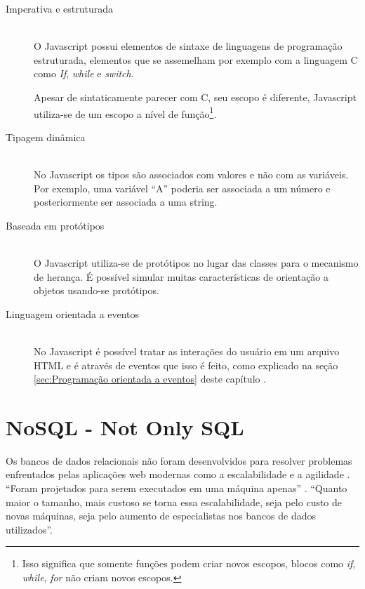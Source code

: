 \begin{description}
\item[Imperativa e estruturada] \hfill \\ 
O Javascript possui elementos de sintaxe de linguagens de programação estruturada, elementos que se assemelham por exemplo com a linguagem C como \textit{If}, \textit{while} e \textit{switch}.

Apesar de sintaticamente parecer com C, seu escopo é diferente, Javascript utiliza-se de um escopo a nível de função\footnote{Isso significa que somente funções podem criar novos escopos, blocos como \textit{if}, \textit{while}, \textit{for} não criam novos escopos.}.

\item[Tipagem dinâmica] \hfill \\
No Javascript os tipos são associados com valores e não com as variáveis. Por exemplo, uma variável ``A'' poderia ser associada a um número e posteriormente ser associada a uma string. 


\item[Baseada em protótipos] \hfill \\
 O Javascript utiliza-se de protótipos no lugar das classes para o mecanismo de herança. É possível simular muitas características de orientação a objetos usando-se protótipos.

\item[Linguagem orientada a eventos] \hfill \\
 No Javascript é possível tratar as interações do usuário em um arquivo HTML e é através de eventos que isso é feito, como explicado na seção \ref{sec:Programação orientada a eventos} deste capítulo .

\end{description}

\section{NoSQL - Not Only SQL}
\label{sec: NoSQL - Not Only SQL}
Os bancos de dados relacionais não foram desenvolvidos para resolver problemas enfrentados pelas aplicações web modernas como a escalabilidade e a agilidade \cite{mongoNosql}. ``Foram projetados para serem executados em uma máquina apenas'' \cite{compBds}. ``Quanto maior o tamanho, mais custoso se torna essa escalabilidade, seja pelo custo de novas máquinas, seja pelo aumento de especialistas nos bancos de dados utilizados''.\cite{IntNosql}

